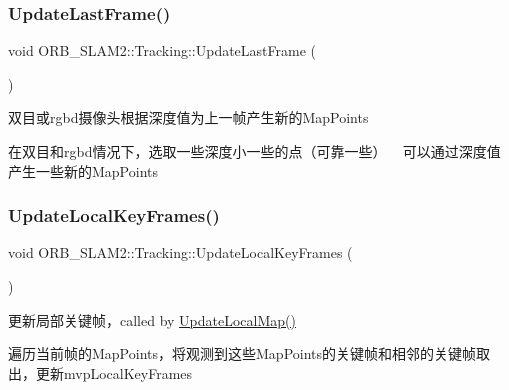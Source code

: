 \subsubsection{\texorpdfstring{Update\+Last\+Frame()}{UpdateLastFrame()}}
{\footnotesize\ttfamily void O\+R\+B\+\_\+\+S\+L\+A\+M2\+::\+Tracking\+::\+Update\+Last\+Frame (\begin{DoxyParamCaption}{ }\end{DoxyParamCaption})\hspace{0.3cm}{\ttfamily [protected]}}



双目或rgbd摄像头根据深度值为上一帧产生新的\+Map\+Points 

在双目和rgbd情况下，选取一些深度小一些的点（可靠一些） ~\newline
可以通过深度值产生一些新的\+Map\+Points \mbox{\label{class_o_r_b___s_l_a_m2_1_1_tracking_a42bed56bbbe8282eb77733e7168d8599}} 
\subsubsection{\texorpdfstring{Update\+Local\+Key\+Frames()}{UpdateLocalKeyFrames()}}
{\footnotesize\ttfamily void O\+R\+B\+\_\+\+S\+L\+A\+M2\+::\+Tracking\+::\+Update\+Local\+Key\+Frames (\begin{DoxyParamCaption}{ }\end{DoxyParamCaption})\hspace{0.3cm}{\ttfamily [protected]}}



更新局部关键帧，called by \mbox{\hyperlink{class_o_r_b___s_l_a_m2_1_1_tracking_a22723e9972c18a888dd51a82eec27b0a}{Update\+Local\+Map()}} 

遍历当前帧的\+Map\+Points，将观测到这些\+Map\+Points的关键帧和相邻的关键帧取出，更新mvp\+Local\+Key\+Frames \mbox{\label{class_o_r_b___s_l_a_m2_1_1_tracking_a22723e9972c18a888dd51a82eec27b0a}} 
